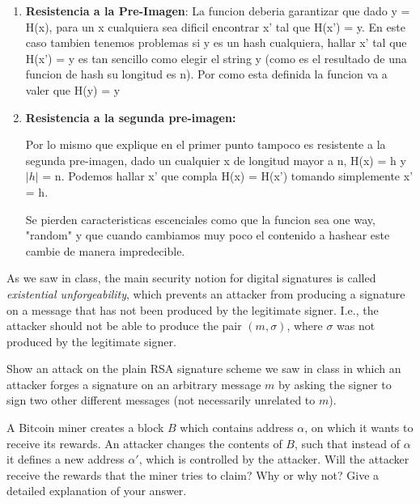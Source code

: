 \documentclass[12pt,addpoints,answers]{exam}
\begin{document}
\begin{questions}
\begin{solution}
\begin{enumerate}
        \item \textbf{Resistencia a la Pre-Imagen}:
        La funcion deberia garantizar que dado y = H(x), para un x cualquiera sea dificil encontrar x' tal que H(x') = y.
        En este caso tambien tenemos problemas si y es un hash cualquiera, hallar x' tal que H(x') = y
        es tan sencillo como elegir el string y (como es el resultado de una funcion de hash su longitud es n). 
        Por como esta definida la funcion va a valer que
        H(y) = y

        \item \textbf{Resistencia a la segunda pre-imagen:} 

        Por lo mismo que explique en el primer punto tampoco es resistente a la segunda pre-imagen, dado un cualquier x 
        de longitud mayor a n, H(x) = h y $|h|$ =  n. Podemos hallar x' que compla H(x) = H(x') tomando simplemente  x' = h.
        

        Se pierden caracteristicas escenciales como que la funcion sea one way, "random" y que cuando cambiamos muy poco
        el contenido a hashear este cambie de manera impredecible.
    \end{enumerate}
\end{solution}

\newpage

\question[10] As we saw in class, the main security notion for digital signatures is called {\em existential unforgeability}, which prevents an attacker from producing a signature on a message that has not been produced by the legitimate signer. I.e., the attacker should not be able to produce the pair $(m, \sigma)$, where $\sigma$ was not produced by the legitimate signer. 

Show an attack on the plain RSA signature scheme we saw in class in which an attacker forges a signature on an arbitrary message $m$ by asking the signer to sign two other different messages (not necessarily unrelated to $m$).

    

\newpage

\question[10] A Bitcoin miner creates a block $B$ which contains address $\alpha$, on which it wants to receive its rewards. An attacker changes the contents of $B$, such that instead of $\alpha$ it defines a new address $\alpha'$, which is controlled by the attacker. Will the attacker receive the rewards that the miner tries to claim? Why or why not? Give a detailed explanation of your answer.


\end{questions}
\end{document}
